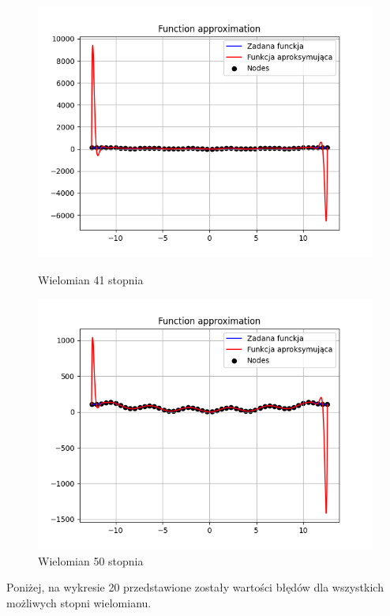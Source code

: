\documentclass{article}
\begin{document}
\begin{figure}[H]
\begin{minipage}[b]{0.49\textwidth}
    \begin{minipage}[b]{\textwidth}
      \includegraphics[width=\textwidth]{img20.png}
      \caption{Wielomian 41 stopnia}
    \end{minipage}
    \vspace*{\fill}
    \begin{minipage}[b]{\textwidth}
      \includegraphics[width=\textwidth]{img21.png}
      \caption{Wielomian 50 stopnia}
    \end{minipage}
  \end{minipage}
\end{figure}

Poniżej, na wykresie 20 przedstawione zostały wartości błędów dla wszystkich możliwych stopni wielomianu.
\end{document}
